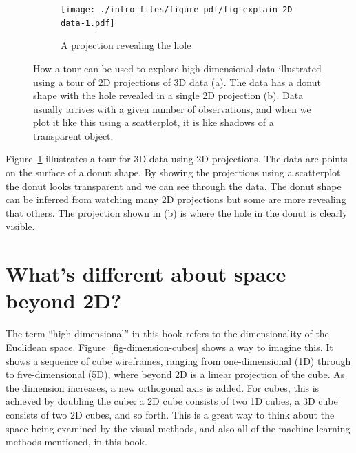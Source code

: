 \documentclass[
  letterpaper,
]{book}
\begin{document}
\begin{figure}

\begin{minipage}[t]{0.57\linewidth}

{\centering 

}

\end{minipage}%
%
\begin{minipage}[t]{0.43\linewidth}

{\centering 

\begin{figure}

{\centering \texttt{[image: ./intro\_files/figure-pdf/fig-explain-2D-data-1.pdf]}

}

\caption{A projection revealing the hole}

\end{figure}

}

\end{minipage}%

\caption{\label{fig-explain-2D}How a tour can be used to explore
high-dimensional data illustrated using a tour of 2D projections of 3D
data (a). The data has a donut shape with the hole revealed in a single
2D projection (b). Data usually arrives with a given number of
observations, and when we plot it like this using a scatterplot, it is
like shadows of a transparent object.}

\end{figure}

Figure~\ref{fig-explain-2D} illustrates a tour for 3D data using 2D
projections. The data are points on the surface of a donut shape. By
showing the projections using a scatterplot the donut looks transparent
and we can see through the data. The donut shape can be inferred from
watching many 2D projections but some are more revealing that others.
The projection shown in (b) is where the hole in the donut is clearly
visible.

\hypertarget{whats-different-about-space-beyond-2d}{%
\section{What's different about space beyond
2D?}\label{whats-different-about-space-beyond-2d}}

The term ``high-dimensional'' in this book refers to the dimensionality
of the Euclidean space. Figure~\ref{fig-dimension-cubes} shows a way to
imagine this. It shows a sequence of cube wireframes, ranging from
one-dimensional (1D) through to five-dimensional (5D), where beyond 2D
is a linear projection of the cube. As the dimension increases, a new
orthogonal axis is added. For cubes, this is achieved by doubling the
cube: a 2D cube consists of two 1D cubes, a 3D cube consists of two 2D
cubes, and so forth. This is a great way to think about the space being
examined by the visual methods, and also all of the machine learning
methods mentioned, in this book.
\end{document}
